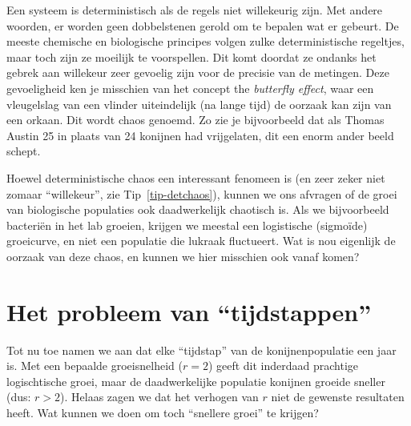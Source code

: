 \documentclass[
  a4paper,
]{scrbook}
\theoremstyle{definition}
\theoremstyle{remark}
\newcounter{quartocallouttipno}
\newcommand{\quartocallouttip}[1]{\refstepcounter{quartocallouttipno}\label{#1}}
\begin{document}
\begin{tcolorbox}[enhanced jigsaw, rightrule=.15mm, opacityback=0, leftrule=.75mm, title=\textcolor{quarto-callout-tip-color}{\faLightbulb}\hspace{0.5em}{Tip \ref*{tip-detchaos}: Meer over ``deterministische chaos'' (verdieping)}, toptitle=1mm, titlerule=0mm, opacitybacktitle=0.6, colframe=quarto-callout-tip-color-frame, breakable, colbacktitle=quarto-callout-tip-color!10!white, coltitle=black, toprule=.15mm, bottomrule=.15mm, left=2mm, bottomtitle=1mm, arc=.35mm, colback=white]

\quartocallouttip{tip-detchaos} 

Een systeem is deterministisch als de regels niet willekeurig zijn. Met
andere woorden, er worden geen dobbelstenen gerold om te bepalen wat er
gebeurt. De meeste chemische en biologische principes volgen zulke
deterministische regeltjes, maar toch zijn ze moeilijk te voorspellen.
Dit komt doordat ze ondanks het gebrek aan willekeur zeer gevoelig zijn
voor de precisie van de metingen. Deze gevoeligheid ken je misschien van
het concept the \emph{butterfly effect}, waar een vleugelslag van een
vlinder uiteindelijk (na lange tijd) de oorzaak kan zijn van een orkaan.
Dit wordt chaos genoemd. Zo zie je bijvoorbeeld dat als Thomas Austin 25
in plaats van 24 konijnen had vrijgelaten, dit een enorm ander beeld
schept.

\end{tcolorbox}

Hoewel deterministische chaos een interessant fenomeen is (en zeer zeker
niet zomaar ``willekeur'', zie Tip~\ref{tip-detchaos}), kunnen we ons
afvragen of de groei van biologische populaties ook daadwerkelijk
chaotisch is. Als we bijvoorbeeld bacteriën in het lab groeien, krijgen
we meestal een logistische (sigmoïde) groeicurve, en niet een populatie
die lukraak fluctueert. Wat is nou eigenlijk de oorzaak van deze chaos,
en kunnen we hier misschien ook vanaf komen?

\section{Het probleem van
``tijdstappen''}\label{het-probleem-van-tijdstappen}

Tot nu toe namen we aan dat elke ``tijdstap'' van de konijnenpopulatie
een jaar is. Met een bepaalde groeisnelheid (\(r=2\)) geeft dit
inderdaad prachtige logischtische groei, maar de daadwerkelijke
populatie konijnen groeide sneller (dus: \(r>2\)). Helaas zagen we dat
het verhogen van \(r\) niet de gewenste resultaten heeft. Wat kunnen we
doen om toch ``snellere groei'' te krijgen?
\end{document}
